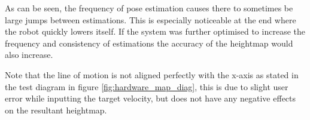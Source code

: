         \noindent
        As can be seen, the frequency of pose estimation causes there to sometimes be large jumps between estimations. This is especially noticeable at the end where the
        robot quickly lowers itself. If the system was further optimised to increase the frequency and consistency of estimations the accuracy of the heightmap
        would also increase.

        Note that the line of motion is not aligned perfectly with the x-axis as stated in the test diagram in figure \ref{fig:hardware_map_diag}, this is due to slight user
        error while inputting the target velocity, but does not have any negative effects on the resultant heightmap.
